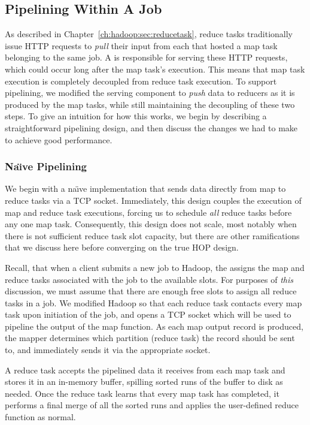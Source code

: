 \subsection{Pipelining Within A Job}
\label{ch:hop:sec:intra-pipe}

As described in Chapter~\ref{ch:hadoop:sec:reducetask}, reduce tasks
traditionally issue HTTP requests to {\em pull} their input from each {\TT}
that hosted a map task belonging to the same job.  A \TT is responsible for
serving these HTTP requests, which could occur long after the map task's
execution.  This means that map task execution is completely decoupled from
reduce task execution.  To support pipelining, we modified the \TT serving
component to {\em push} data to reducers as it is produced by the map tasks,
while still maintaining the decoupling of these two steps.  To give an
intuition for how this works, we begin by describing a straightforward
pipelining design, and then discuss the changes we had to make to achieve good
performance.

\subsubsection{Na\"{\i}ve Pipelining}
\label{ch:hop:sec:naive}

We begin with a na\"{\i}ve implementation that sends data directly from map to
reduce tasks via a TCP socket.  Immediately, this design couples the execution
of map and reduce task executions, forcing us to schedule {\em all} reduce
tasks before any one map task.  Consequently, this design does not scale, most
notably when there is not sufficient reduce task slot capacity, but there are
other ramifications that we discuss here before converging on the true HOP
design.

Recall, that when a client submits a new job to Hadoop, the {\JT} assigns the
map and reduce tasks associated with the job to the available {\TT} slots.  For
purposes of {\em this} discussion, we must assume that there are enough free
slots to assign all reduce tasks in a job.  We modified Hadoop so that each
reduce task contacts every map task upon initiation of the job, and opens a TCP
socket which will be used to pipeline the output of the map function.  As each
map output record is produced, the mapper determines which partition (reduce
task) the record should be sent to, and immediately sends it via the
appropriate socket.

A reduce task accepts the pipelined data it receives from each map task and
stores it in an in-memory buffer, spilling sorted runs of the buffer to disk as
needed. Once the reduce task learns that every map task has completed, it
performs a final merge of all the sorted runs and applies the user-defined
reduce function as normal.


